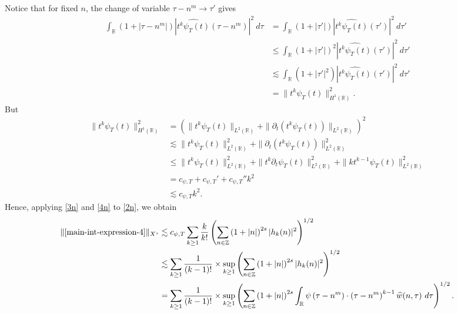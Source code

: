 \documentclass[12pt,reqno]{amsart}
\numberwithin{equation}{section}  %
\numberwithin{figure}{section}
\newcommand{\rr}{\mathbb{R}}
\newcommand{\zz}{\mathbb{Z}}
\newcommand{\wh}{\widehat}
\newcommand{\p}{\partial}
\theoremstyle{plain}
\theoremstyle{definition}
\theoremstyle{remark}
\begin{document}
%
%
Notice that for fixed $n$, the change of variable $\tau - n^{m } \to \tau'$
gives
%
%
\begin{equation}
	\label{3n}
	\begin{split}
		\int_\rr \left( 1 + | \tau - n^{m } | \right) | \wh{t^{k}
		\psi_{T}(t)}\left( \tau - n^{m } \right) |^2 \ d \tau
		& = \int_\rr \left( 1 + |\tau'| \right) | \wh{t^k \psi_{T}(t)}(\tau') |^2 \
		d \tau'
		\\
		& \le \int_\rr \left( 1 + |\tau'| \right)^2 | \wh{t^k \psi_{T}(t)}(\tau')
		|^2 \ d \tau'
		\\
		& \lesssim \int_\rr \left( 1 + | \tau' |^2 \right) | \wh{t^{k}
		\psi_{T}(t)}(\tau') |^2 \ d \tau'
		\\
		& = \|t^k \psi_{T}(t) \|_{H^1(\rr)}^2.
	\end{split}
\end{equation}
%
%
But
%
%
\begin{equation}
	\label{4n}
	\begin{split}
		\|t^k \psi_{T}(t) \|_{H^1(\rr)}^2
		& = \left( \|t^k \psi_{T}(t)\|_{L^2(\rr)} + \|\p_t \left( t^k \psi_{T}(t)
		\right)\|_{L^2(\rr)} \right)^2
		\\
		& \lesssim \|t^{k}\psi_{T}(t) \|_{L^2(\rr)}^2 + \|\p_t \left (t^{k}
		\psi_{T}(t) \right )\|_{L^2(\rr)}^2
		\\
		& \le \|t^k \psi_{T}(t) \|_{L^2(\rr)}^2 + \|t^k \p_t \psi_{T}(t)
		\|_{L^2(\rr)}^2 + \|k t^{k -1} \psi_{T}(t) \|_{L^2(\rr)}^2
		\\
		& = c_{\psi, T} + c_{\psi, T}' + c_{\psi, T}''k^2 
		\\
    & \lesssim c_{\psi, T} k^2.
	\end{split}
\end{equation}
%
%
Hence, applying \eqref{3n} and \eqref{4n} to \eqref{2n}, we obtain
%
\begin{equation}
	\label{5n}
	\begin{split}
		\|\eqref{main-int-expression-4} \|_{X^s}
		& \lesssim
    c_{\psi, T}\sum_{k \ge 1} \frac{k}{k!} \left( \sum_{n \in \zz} \left (1 + |n| \right )^{2s} | h_k(n) |^2 
		\right)^{1/2}
		\\
		& \lesssim \sum_{k \ge 1} \frac{1}{(k-1)!}
		\times \sup_{k \ge 1} \left( \sum_{n \in \zz} \left (1 + |n| \right )^{2s} | 
		h_k(n) |^2 \right)^{1/2}
		\\
		& = \sum_{k \ge 1} \frac{1}{(k-1)!} \times \sup_{k \ge 1} 
		\left( \sum_{n \in \zz} \left (1 + |n| \right )^{2s} \int_\rr 
		\psi\left( \tau - n^{m } \right) \cdot \left( \tau - n^{m } 
		\right)^{k -1} \wh{w}(n, \tau) \ d \tau \right)^{1/2}.
    	\end{split}
\end{equation}
\end{document}
